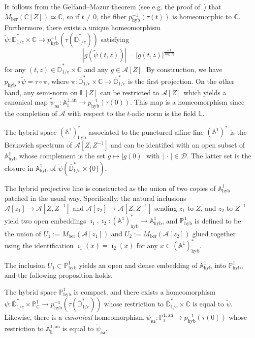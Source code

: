 \documentclass[10pt]{amsart}
\theoremstyle{definition}\newtheorem{defi}[theo]{Definition}\newtheorem{rema}[theo]{Remark}\newtheorem{exam}[theo]{Example}\newtheorem{exem}[theo]{Example}\newtheorem{nota}[theo]{Notation}
\DeclareMathOperator{\hyb}{hyb}
\newcommand{\cc}{\mathbb{C}}
\newcommand{\phyb}{{\mathbb{P}^1_{\mathrm{hyb}}}}
\newcommand{\cA}{\mathcal{A}}
\newcommand{\cD}{\mathcal{D}}
\newcommand{\A}{{\mathbb A}}
\newcommand{\D}{\mathbb{D}}
\newcommand{\an}{\mathrm{an}}
\newcommand{\PP}{\mathbb{P}}
\newcommand{\Laurent}{\mathbb{L}}
\newcommand{\lrpar}[1]{\left(#1\right)}
\newcommand{\na}{\mathsf{na}}
\newcommand{\inv}{^{-1}}
\begin{document}
It follows from the Gelfand--Mazur theorem (see e.g. the proof of~\cite[Prop.~1.1]{degeneration}) that $M_{\mathrm{ber}}(\cc[Z]) \simeq \cc$, so if $t\neq 0$, the fiber $p_{\hyb}\inv(\tau(t))$ is homeomorphic to $\cc$. Furthermore, there exists a unique homeomorphism $\widetilde \psi: \overline{\D}^*_{1/e} \times \cc \to p_{\hyb}^{-1}(\tau (\overline{\D}^*_{1/e})) $ satisfying
\begin{equation}\label{eq:identify}
|g(\widetilde\psi(t,z))| = |g(t,z)|^{\frac{-1}{\log \mathopen| t \mathclose|}}
\end{equation}
for any $(t,z) \in \overline{\D}^*_{1/e} \times \cc $ and any $g\in \cA[Z]$. By construction, we have $ p_{\hyb} \circ \widetilde\psi=\tau \circ \pi$, where $\pi: \overline{\D}^*_{1/e} \times \cc \to\overline{\D}^*_{1/e} $ is the first projection. On the other hand, any semi-norm on $\Laurent[Z]$ can be restricted to $\cA[Z]$ which yields a canonical map $\widetilde\psi_{\na}: \A^{1,\an}_{\Laurent} \to p_{\hyb}\inv(\tau(0))$. This map is a homeomorphism since the completion of $\cA$ with respect to the $t$-adic norm is the field $\Laurent$.


The hybrid space $(\A^1)^*_{\hyb}$ associated to the punctured affine line $(\A^1)^*$ is the Berkovich spectrum of $\cA[Z,Z^{-1}]$ and can be identified with an open subset of $\A^1_{\hyb}$ whose complement is the set $ g \mapsto |g(0)|$ with $|{\,\cdot\,}| \in \cD$. The latter set is the closure in $\A^1_{\hyb}$ of $\widetilde{\psi}\lrpar{\overline{\D}^*_{1/e} \times \{0\} }$.


The hybrid projective line is constructed as the union of two copies of $\A^1_{\hyb}$ patched in the usual way. Specifically, the natural inclusions $ \cA[z_1] \to \cA[Z,Z^{-1}]$ and $\cA[z_2] \to \cA[Z,Z^{-1}]$ sending $z_1$ to $Z$, and $z_2$ to $Z^{-1}$ yield two open embeddings $\imath_1, \imath_2\colon(\A^1)^*_{\hyb} \to \A^1_{\hyb}$, and $\phyb$ is defined to be the union of $U_1:=M_{\mathrm{ber}}(\cA[z_1])$ and $U_2 :=M_{\mathrm{ber}}(\cA[z_2])$ glued together using the identification $\imath_1(x) = \imath_2(x)$ for any $x\in (\A^1)^*_{\hyb}$.

The inclusion $U_1 \subset \PP^1_{\hyb}$ yields an open and dense embedding of $\A^1_{\hyb}$ into $\PP^1_{\hyb}$, and the following proposition holds.
\begin{prop}
The hybrid space $\PP^1_{\hyb}$ is compact, and there exists a homeomorphism $\psi: \overline{\D}^*_{1/e} \times \PP^1_\cc \to p_{\hyb}^{-1}(\tau (\overline{\D}^*_{1/e})) $ whose restriction to $\overline{\D}^*_{1/e} \times \cc $ is equal to $\widetilde \psi $. Likewise, there is a \emph{canonical} homeomorphism $\psi_\na: \PP^{1,\an}_{\Laurent} \to p_{\hyb}\inv(\tau(0))$ whose restriction to $\A^{1,\an}_{\Laurent}$ is equal to $\widetilde \psi_{\na}$.
\end{prop}
\end{document}
